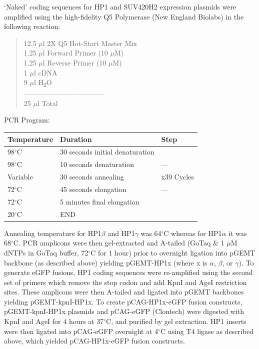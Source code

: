 \documentclass[onehalf,12pt]{beavtex}
\begin{document}
  `Naked' coding sequences for HP1 and SUV420H2 expression plasmids were
  amplified using the high-fidelity Q5 Polymerase (New England Biolabs) in
  the following reaction:
  
  \begin{quote}
  12.5 \(\mu\)l 2X Q5 Hot-Start Master Mix\\
  1.25 \(\mu\)l Forward Primer (10 \(\mu\)M)\\
  1.25 \(\mu\)l Reverse Primer (10 \(\mu\)M)\\
  1 \(\mu\)l cDNA\\
  9 \(\mu\)l H\textsubscript{2}O\\
  -----------------------------------\\
  25 \(\mu\)l Total
  \end{quote}
  
  PCR Program:
  
  \begin{longtable}[]{@{}lll@{}}
  \toprule
  Temperature & Duration & Step\tabularnewline
  \midrule
  \endhead
  98\(^\circ\)C & 30 seconds initial denaturation &\tabularnewline
  98\(^\circ\)C & 10 seconds denaturation & ---\tabularnewline
  Variable & 30 seconds annealing & x39 Cycles\tabularnewline
  72\(^\circ\)C & 45 seconds elongation & ---\tabularnewline
  72\(^\circ\)C & 5 minutes final elongation &\tabularnewline
  20\(^\circ\)C & END &\tabularnewline
  \bottomrule
  \end{longtable}
  
  Annealing temperature for HP1\(\beta\) and HP1\(\gamma\) was
  64\(^\circ\)C whereas for HP1\(\alpha\) it was 68\(^\circ\)C. PCR
  amplicons were then gel-extracted and A-tailed (GoTaq \& 1 \(\mu\)M
  dNTPs in GoTaq buffer, 72\(^\circ\)C for 1 hour) prior to overnight
  ligation into pGEMT backbone (as described above) yielding pGEMT-HP1x
  (where x is \(\alpha\), \(\beta\), or \(\gamma\)). To generate eGFP
  fusions, HP1 coding sequences were re-amplified using the second set of
  primers which remove the stop codon and add KpnI and AgeI restriction
  sites. These amplicons were then A-tailed and ligated into pGEMT
  backbones yielding pGEMT-kpnI-HP1x. To create pCAG-HP1x-eGFP fusion
  constructs, pGEMT-kpnI-HP1x plasmids and pCAG-eGFP (Clontech) were
  digested with KpnI and AgeI for 4 hours at 37\(^\circ\)C, and purified
  by gel extraction. HP1 inserts were then ligated into pCAG-eGFP
  overnight at 4\(^\circ\)C using T4 ligase as described above, which
  yielded pCAG-HP1x-eGFP fusion constructs.
  
\end{document}
